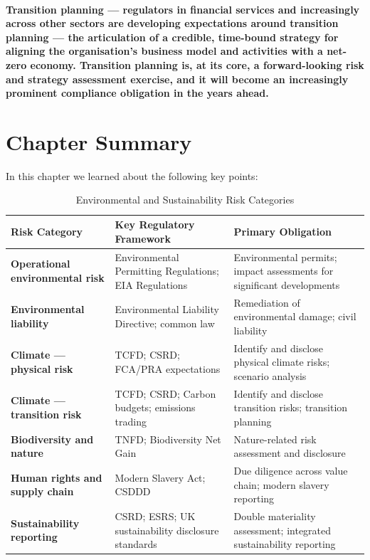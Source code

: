 \paragraph{\textbf{Transition planning} — regulators in financial services and increasingly across other sectors are developing expectations around \textbf{transition planning} — the articulation of a credible, time-bound strategy for aligning the organisation's business model and activities with a net-zero economy. Transition planning is, at its core, a forward-looking risk and strategy assessment exercise, and it will become an increasingly prominent compliance obligation in the years ahead.}

\newpage
\section{Chapter Summary}
In this chapter we learned about the following key points:
\begin{table}[H]
  \centering
  \renewcommand{\arraystretch}{1.5}
  \begin{tabularx}{\textwidth}{ | >{\raggedright\arraybackslash}p{} 
								| >{\raggedright\arraybackslash}p{} 
                                | >{\raggedright\arraybackslash}X | }
    \hline
    \textbf{Risk Category} & \textbf{Key Regulatory Framework} & \textbf{Primary Obligation} \\
    \hline
    \textbf{Operational environmental risk} & Environmental Permitting Regulations; EIA Regulations & Environmental permits; impact assessments for significant developments\\
    \hline
    \textbf{Environmental liability} & Environmental Liability Directive; common law & Remediation of environmental damage; civil liability\\
    \hline
    \textbf{Climate — physical risk} & TCFD; CSRD; FCA/PRA expectations & Identify and disclose physical climate risks; scenario analysis\\
    \hline
    \textbf{Climate — transition risk} & TCFD; CSRD; Carbon budgets; emissions trading & Identify and disclose transition risks; transition planning\\
    \hline
    \textbf{Biodiversity and nature} & TNFD; Biodiversity Net Gain & Nature-related risk assessment and disclosure\\
    \hline
    \textbf{Human rights and supply chain} & Modern Slavery Act; CSDDD & Due diligence across value chain; modern slavery reporting\\
    \hline
    \textbf{Sustainability reporting} & CSRD; ESRS; UK sustainability disclosure standards & Double materiality assessment; integrated sustainability reporting\\
    \hline
  \end{tabularx}
  \caption{Environmental and Sustainability Risk Categories}
\end{table}

